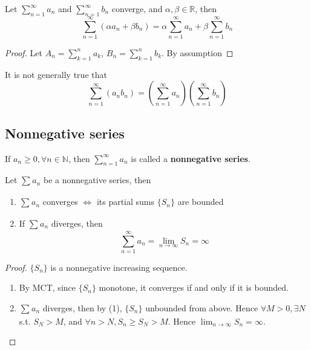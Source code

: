\begin{proposition}
    Let $\sum\limits_{n= 1}^{\infty} a_n$ and 
    $\sum\limits_{n=1}^{\infty} b_n$ converge,
    and $\alpha, \beta \in \mathbb{R}$,
    then 
    \[
        \sum\limits_{n= 1}^{\infty} \left( \alpha a_n + \beta b_n \right) 
        = \alpha \sum\limits_{n=1}^{\infty} a_n + \beta \sum\limits_{n =1}^{\infty} b_n
    \]
\end{proposition}

\begin{proof}
    Let $A_n = \sum\limits_{k= 1}^{n} a_k$,
    $B_n = \sum\limits_{k= 1}^{n} b_k$.
    By assumption
\end{proof}

\begin{remark}
    It is not generally true that 
    \[
        \sum\limits_{n = 1}^{\infty} (a_n b_n) 
        = 
        \left( \sum\limits_{n = 1}^{\infty} a_n \right) 
        \left( \sum\limits_{n = 1}^{\infty} b_n \right) 
    \]
\end{remark}

\subsection{Nonnegative series}

\begin{definition}
    If $a_n \geq 0, \forall n \in \mathbb{N}$,
    then $\sum\limits_{n= 1}^{\infty} a_n$ is called a 
    \textbf{nonnegative series}.
\end{definition}

\begin{theorem}
    \label{thm:nonnegative-series-1}
    Let $\sum\limits_{}^{} a_n$ be a nonnegative series, then 
    \begin{enumerate}
        \item $\sum\limits_{}^{} a_n $ converges $\iff$ 
        its partial sums $\{ S_n \} $ are bounded
        \item If $\sum\limits_{}^{} a_n$ diverges, then 
        \[
            \sum\limits_{n=1}^{\infty} a_n = \lim_{n \to \infty} S_n = \infty
        \]
    \end{enumerate} 
\end{theorem}

\begin{proof}
    $\{ S_n \} $ is a nonnegative increasing sequence. 
    \begin{enumerate}
        \item By MCT, since $ \{ S_n \} $ monotone,
        it converges if and only if it is bounded.
        \item $\sum\limits_{}^{} a_n$ diverges, then
        by (1), $\{ S_n \} $ unbounded from above.
        Hence $\forall M > 0, \exists N$ s.t. 
        $S_N > M$, 
        and $\forall n > N, S_n \geq S_N > M$.
        Hence 
        $\lim_{n \to \infty}S_n = \infty$.
    \end{enumerate} 
\end{proof}

